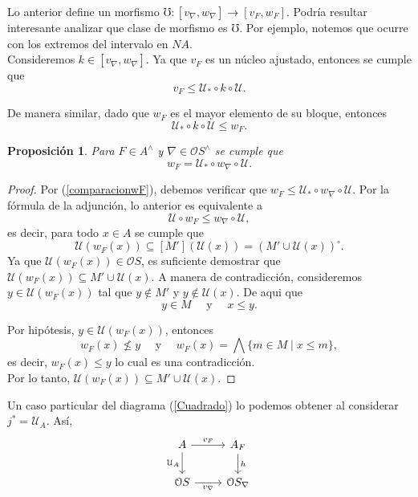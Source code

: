 \documentclass[11pt]{amsart}
\theoremstyle{plain}
\newtheorem{prop}[thm]{Proposición}
\theoremstyle{definition}
\begin{document}
Lo anterior define un morfismo $\mho\colon [v_\nabla, w_\nabla]\to [v_F, w_F]$. Podría resultar interesante analizar que clase de morfismo es $\mho$. 
Por ejemplo, notemos que ocurre con los extremos del intervalo en $NA$.\\

Consideremos $k\in [v_\nabla, w_\nabla]$. Ya que $v_F$ es un núcleo ajustado, entonces se cumple que 
\begin{equation}\label{comparacionvF}
v_F\leq \mathcal{U}_*\circ k\circ \mathcal{U}. 
\end{equation}

De manera similar, dado que $w_F$ es el mayor elemento de su bloque, entonces
\begin{equation}\label{comparacionwF}
\mathcal{U}_*\circ k\circ \mathcal{U}\leq w_F.
\end{equation}

\begin{prop}\label{igualdadwF}
Para $F\in A^\wedge$ y $\nabla\in \mathcal{O}S^\wedge$ se cumple que 
\[
w_F=\mathcal{U}_*\circ w_\nabla\circ \mathcal{U}.
\]
\end{prop}

\begin{proof}
Por (\ref{comparacionwF}), debemos verificar que $w_F\leq \mathcal{U}_*\circ w_\nabla\circ \mathcal{U}$. Por la fórmula de la adjunción,
lo anterior es equivalente a 
\[
\mathcal{U}\circ w_F\leq w_\nabla\circ \mathcal{U},
\]
es decir, para todo $x\in A$ se cumple que 
\[
\mathcal{U}(w_F(x))\subseteq [M'](\mathcal{U}(x))=(M'\cup \mathcal{U}(x))^\circ.
\]
Ya que $\mathcal{U}(w_F(x))\in \mathcal{O}S$, es suficiente demostrar que $\mathcal{U}(w_F(x))\subseteq M'\cup \mathcal{U}(x)$.
A manera de contradicción, consideremos $y\in \mathcal{U}(w_F(x))$ tal que $y\notin M'$ y $y\notin \mathcal{U}(x)$. De aqui que
\[
y\in M\quad\text{ y }\quad x\leq y.
\]

Por hipótesis, $y\in \mathcal{U}(w_F(x))$, entonces 
\[
w_F(x)\nleq y\quad \text{ y }\quad w_F(x)=\bigwedge\{m\in M\mid x\leq m\},
\]
es decir, $w_F(x)\leq y$ lo cual es una contradicción.\\ 

Por lo tanto, $\mathcal{U}(w_F(x))\subseteq M'\cup \mathcal{U}(x)$.
\end{proof}


Un caso particular del diagrama (\ref{Cuadrado}) lo podemos obtener al considerar $j^*=\mathcal{U}_A$. Así,
\[\begin{tikzcd}
	A & {A_F} \\
	{\mathcal{O}S} & {\mathcal{O}S_\nabla}
	\arrow["{v_F}", from=1-1, to=1-2]
	\arrow["{\mathcal{U}_A}"', from=1-1, to=2-1]
	\arrow["h", from=1-2, to=2-2]
	\arrow["{v_\nabla}"', from=2-1, to=2-2]
\end{tikzcd}\]
\end{document}
